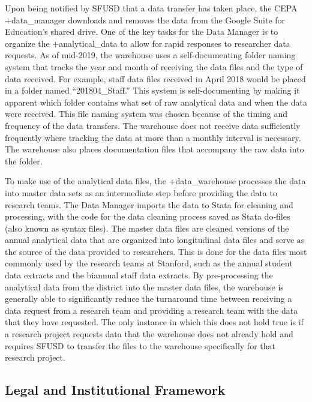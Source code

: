 \documentclass[
]{WileySix}
\begin{document}
Upon being notified by SFUSD that a data transfer has taken place, the CEPA +data\_manager\textbar{} downloads and removes the data from the Google Suite for Education's shared drive. One of the key tasks for the Data Manager is to organize the +analytical\_data\textbar{} to allow for rapid responses to researcher data requests. As of mid-2019, the warehouse uses a self-documenting folder naming system that tracks the year and month of receiving the data files and the type of data received. For example, staff data files received in April 2018 would be placed in a folder named ``201804\_Staff.'' This system is self-documenting by making it apparent which folder contains what set of raw analytical data and when the data were received. This file naming system was chosen because of the timing and frequency of the data transfers. The warehouse does not receive data sufficiently frequently where tracking the data at more than a monthly interval is necessary. The warehouse also places documentation files that accompany the raw data into the folder.

To make use of the analytical data files, the +data\_warehouse\textbar{} processes the data into master data sets as an intermediate step before providing the data to research teams. The Data Manager imports the data to Stata for cleaning and processing, with the code for the data cleaning process saved as Stata do-files (also known as syntax files). The master data files are cleaned versions of the annual analytical data that are organized into longitudinal data files and serve as the source of the data provided to researchers. This is done for the data files most commonly used by the research teams at Stanford, such as the annual student data extracts and the biannual staff data extracts. By pre-processing the analytical data from the district into the master data files, the warehouse is generally able to significantly reduce the turnaround time between receiving a data request from a research team and providing a research team with the data that they have requested. The only instance in which this does not hold true is if a research project requests data that the warehouse does not already hold and requires SFUSD to transfer the files to the warehouse specifically for that research project.

\hypertarget{legal-and-institutional-framework-5}{%
\subsection{Legal and Institutional Framework}\label{legal-and-institutional-framework-5}}
\end{document}
